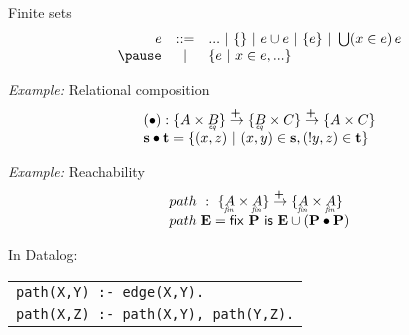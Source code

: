 \documentclass{beamer}
\newcommand{\mto}{\overset{\textbf{+}\:}{\to}}
\newcommand{\eq}[1]{\underaccent{\mathit{eq}}{#1}}
\newcommand{\fin}[1]{\underaccent{\mathit{fin}}{#1}}
\newcommand{\m}[1]{\ensuremath{\mathbf{#1}}}
\newcommand{\ms}{\mathsf}
\begin{document}
\begin{frame}{Finite sets}\Large
  \[
  \begin{array}{rcl}
    e &::=& ... ~|~ \{\} ~|~ e \cup e ~|~ \{e\} ~|~ \bigcup(x \in e)\, e\\
      \pause&~|~& \{e ~|~ x \in e, ...\}
  \end{array}
  \]

  \pause

  \begin{mathpar}
  \end{mathpar}
\end{frame}


\begin{frame}{{\it Example:} Relational composition}\Large
  \[\begin{array}{l}
    (\bullet) : \{A \times \eq{B}\} \mto \{\eq{B} \times C\} \mto \{A \times C\}\\
    \m{s} \bullet \m{t} =
    \{(x,z) ~|~ (x,y) \in \m{s}, (!y,z) \in \m{t}\}
  \end{array}\]
\end{frame}

\begin{frame}{{\it Example:} Reachability}\Large
  \[\begin{array}{l}
    path ~:~ \{\fin{A} \times \fin{A}\} \mto \{\fin{A} \times \fin{A}\}\\
    path\;\m{E} = \ms{fix}~\m{P}~\ms{is}~ \m{E} \cup (\m{P} \bullet \m{P})
  \end{array}\]

  \vspace{1.5em}

  In Datalog:\vspace{1em}\\
  \begin{tabular}{l}
    \texttt{path(X,Y) :- edge(X,Y).}\\
    \texttt{path(X,Z) :- path(X,Y), path(Y,Z).}\\
  \end{tabular}
\end{frame}
\end{document}
